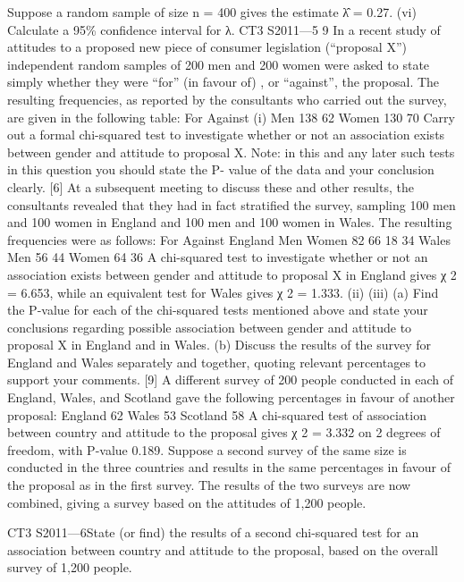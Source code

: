\documentclass[a4paper,12pt]{article}
\begin{document}
\begin{enumerate}
Suppose a random sample of size n = 400 gives the estimate λ̂ = 0.27.
(vi)
Calculate a 95\% confidence interval for λ.
CT3 S2011—5
9
In a recent study of attitudes to a proposed new piece of consumer legislation (“proposal X”) independent random samples of 200 men and 200 women were asked to state simply whether they were “for” (in favour of) , or “against”, the proposal.
The resulting frequencies, as reported by the consultants who carried out the survey, are given in the following table:
For
Against
(i)
Men
138
62
Women
130
70
Carry out a formal chi-squared test to investigate whether or not an association
exists between gender and attitude to proposal X.
Note: in this and any later such tests in this question you should state the P-
value of the data and your conclusion clearly.
[6]
At a subsequent meeting to discuss these and other results, the consultants revealed
that they had in fact stratified the survey, sampling 100 men and 100 women in
England and 100 men and 100 women in Wales. The resulting frequencies were as
follows:
For
Against
England
Men
Women
82
66
18
34
Wales
Men
56
44
Women
64
36
A chi-squared test to investigate whether or not an association exists between gender
and attitude to proposal X in England gives χ 2 = 6.653, while an equivalent test for
Wales gives χ 2 = 1.333.
(ii)
(iii)
(a) Find the P-value for each of the chi-squared tests mentioned above and state your conclusions regarding possible association between gender and attitude to proposal X in England and in Wales.
(b) Discuss the results of the survey for England and Wales separately and together, quoting relevant percentages to support your comments.
[9]
A different survey of 200 people conducted in each of England, Wales, and
Scotland gave the following percentages in favour of another proposal:
England
62%
Wales
53%
Scotland
58%
A chi-squared test of association between country and attitude to the proposal gives χ 2 = 3.332 on 2 degrees of freedom, with P-value 0.189.
Suppose a second survey of the same size is conducted in the three countries and results in the same percentages in favour of the proposal as in the first survey. The results of the two surveys are now combined, giving a survey based on the attitudes of 1,200 people.

CT3 S2011—6State (or find) the results of a second chi-squared test for an association
between country and attitude to the proposal, based on the overall
survey of 1,200 people.


\end{enumerate}
\end{document}
